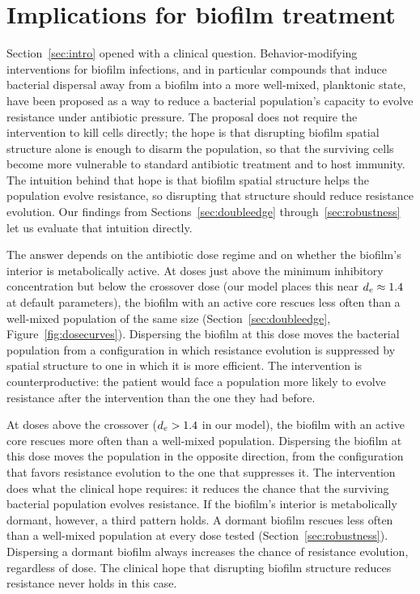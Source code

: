 \section{Implications for biofilm treatment}
\label{sec:implications}

Section~\ref{sec:intro} opened with a clinical question. Behavior-modifying interventions for biofilm infections, and in particular compounds that induce bacterial dispersal away from a biofilm into a more well-mixed, planktonic state, have been proposed as a way to reduce a bacterial population's capacity to evolve resistance under antibiotic pressure. The proposal does not require the intervention to kill cells directly; the hope is that disrupting biofilm spatial structure alone is enough to disarm the population, so that the surviving cells become more vulnerable to standard antibiotic treatment and to host immunity. The intuition behind that hope is that biofilm spatial structure helps the population evolve resistance, so disrupting that structure should reduce resistance evolution. Our findings from Sections~\ref{sec:doubleedge} through~\ref{sec:robustness} let us evaluate that intuition directly.

The answer depends on the antibiotic dose regime and on whether the biofilm's interior is metabolically active. At doses just above the minimum inhibitory concentration but below the crossover dose (our model places this near $d_e \approx 1.4$ at default parameters), the biofilm with an active core rescues less often than a well-mixed population of the same size (Section~\ref{sec:doubleedge}, Figure~\ref{fig:dosecurves}). Dispersing the biofilm at this dose moves the bacterial population from a configuration in which resistance evolution is suppressed by spatial structure to one in which it is more efficient. The intervention is counterproductive: the patient would face a population more likely to evolve resistance after the intervention than the one they had before.

At doses above the crossover ($d_e > 1.4$ in our model), the biofilm with an active core rescues more often than a well-mixed population. Dispersing the biofilm at this dose moves the population in the opposite direction, from the configuration that favors resistance evolution to the one that suppresses it. The intervention does what the clinical hope requires: it reduces the chance that the surviving bacterial population evolves resistance. If the biofilm's interior is metabolically dormant, however, a third pattern holds. A dormant biofilm rescues less often than a well-mixed population at every dose tested (Section~\ref{sec:robustness}). Dispersing a dormant biofilm always increases the chance of resistance evolution, regardless of dose. The clinical hope that disrupting biofilm structure reduces resistance never holds in this case.

